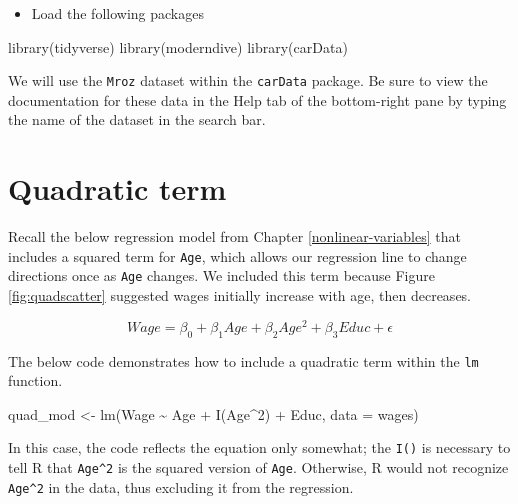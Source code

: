 \documentclass[
]{book}
\makeatletter
\newenvironment{Shaded}{\begin{snugshade}}{\end{snugshade}}
\newcommand{\AttributeTok}[1]{\textcolor[rgb]{0.61,0.61,0.61}{#1}}
\newcommand{\DecValTok}[1]{\textcolor[rgb]{0.06,0.06,0.06}{#1}}
\newcommand{\FunctionTok}[1]{\textcolor[rgb]{0,0,0}{#1}}
\newcommand{\NormalTok}[1]{#1}
\newcommand{\OtherTok}[1]{\textcolor[rgb]{0.37,0.37,0.37}{#1}}
\newcommand{\SpecialCharTok}[1]{\textcolor[rgb]{0,0,0}{#1}}
\providecommand{\tightlist}{%
  \setlength{\itemsep}{0pt}\setlength{\parskip}{0pt}}
\newenvironment{kframe}{%
\medskip{}
\setlength{\fboxsep}{.8em}
 \def\at@end@of@kframe{}%
 \ifinner\ifhmode%
  \def\at@end@of@kframe{\end{minipage}}%
  \begin{minipage}{\columnwidth}%
 \fi\fi%
 \def\FrameCommand##1{\hskip\@totalleftmargin \hskip-\fboxsep
 \colorbox{shadecolor}{##1}\hskip-\fboxsep
     \hskip-\linewidth \hskip-\@totalleftmargin \hskip\columnwidth}%
 \MakeFramed {\advance\hsize-\width
   \@totalleftmargin\z@ \linewidth\hsize
   \@setminipage}}%
 {\par\unskip\endMakeFramed%
 \at@end@of@kframe}
\renewenvironment{Shaded}{\begin{kframe}}{\end{kframe}}
\makeatother
\begin{document}
\begin{itemize}
\tightlist
\item
  Load the following packages
\end{itemize}

\begin{Shaded}
\begin{Highlighting}[]
\FunctionTok{library}\NormalTok{(tidyverse)}
\FunctionTok{library}\NormalTok{(moderndive)}
\FunctionTok{library}\NormalTok{(carData)}
\end{Highlighting}
\end{Shaded}

We will use the \texttt{Mroz} dataset within the \texttt{carData} package. Be sure to view the documentation for these data in the Help tab of the bottom-right pane by typing the name of the dataset in the search bar.

\hypertarget{quadratic-term}{%
\section{Quadratic term}\label{quadratic-term}}

Recall the below regression model from Chapter \ref{nonlinear-variables} that includes a squared term for \texttt{Age}, which allows our regression line to change directions once as \texttt{Age} changes. We included this term because Figure \ref{fig:quadscatter} suggested wages initially increase with age, then decreases.

\begin{equation}
Wage = \beta_0 + \beta_1Age + \beta_2Age^2 + \beta_3Educ + \epsilon
\end{equation}

The below code demonstrates how to include a quadratic term within the \texttt{lm} function.

\begin{Shaded}
\begin{Highlighting}[]
\NormalTok{quad\_mod }\OtherTok{\textless{}{-}} \FunctionTok{lm}\NormalTok{(Wage }\SpecialCharTok{\textasciitilde{}}\NormalTok{ Age }\SpecialCharTok{+} \FunctionTok{I}\NormalTok{(Age}\SpecialCharTok{\^{}}\DecValTok{2}\NormalTok{) }\SpecialCharTok{+}\NormalTok{ Educ, }\AttributeTok{data =}\NormalTok{ wages)}
\end{Highlighting}
\end{Shaded}

In this case, the code reflects the equation only somewhat; the \texttt{I()} is necessary to tell R that \texttt{Age\^{}2} is the squared version of \texttt{Age}. Otherwise, R would not recognize \texttt{Age\^{}2} in the data, thus excluding it from the regression.
\end{document}
